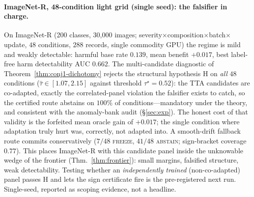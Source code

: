 \documentclass[conference]{IEEEtran}
\theoremstyle{plain}
\theoremstyle{definition}
\begin{document}
\paragraph{ImageNet-R, 48-condition light grid (single seed): the falsifier in charge.}
On ImageNet-R (200 classes, 30{,}000 images; severity$\times$composition$\times$batch$\times$update,
$48$ conditions, $288$ records, single commodity GPU) the regime is mild and weakly
detectable: harmful base rate $0.139$, mean benefit $+0.017$, best label-free harm
detectability AUC $0.662$. The multi-candidate diagnostic of
Theorem~\ref{thm:conj1-dichotomy} rejects the structural hypothesis H on \emph{all}
$48$ conditions ($\hat\tau\in[1.07,2.15]$ against threshold $\tau^\star{=}0.52$): the
TTA candidates are co-adapted, exactly the correlated-panel violation the falsifier
exists to catch, so the certified route abstains on $100\%$ of conditions---mandatory
under the theory, and consistent with the anomaly-bank audit
(\S\ref{sec:exp}). The honest cost of that validity is the forfeited mean oracle gain
of $+0.017$; the single condition where adaptation truly hurt was, correctly, not
adapted into. A smooth-drift fallback route commits conservatively ($7/48$
\textsc{freeze}, $41/48$ \textsc{abstain}; sign-bracket coverage $0.77$). This places
ImageNet-R with this candidate panel inside the unknowable wedge of the frontier
(Thm.~\ref{thm:frontier}): small margins, falsified structure, weak detectability.
Testing whether an \emph{independently trained} (non-co-adapted) panel passes H and
lets the sign certificate fire is the pre-registered next run. Single-seed, reported
as scoping evidence, not a headline.
\end{document}
